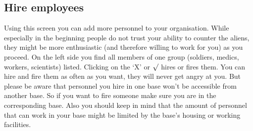 \subsection{Hire employees}
Using this screen you can add more personnel to your organisation. While especially in the beginning people do not trust your ability to counter the aliens, they might be more enthusiastic (and therefore willing to work for you) as you proceed. On the left side you find all members of one group (soldiers, medics, workers, scientists) listed. Clicking on the `X' or $\surd$ hires or fires them. You can hire and fire  them as often as you want, they will never get angry at you. But please be aware that personnel you hire in one base won't be accessible from another base. So if you want to fire someone make sure you are in the corresponding base. Also you should keep in mind that the amount of personnel that can work in your base might be limited by the base's housing or working facilities. 

